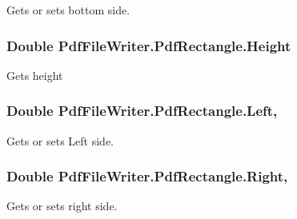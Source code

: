 Gets or sets bottom side. 

\subsubsection[{\texorpdfstring{Height}{Height}}]{\setlength{\rightskip}{0pt plus 5cm}Double Pdf\+File\+Writer.\+Pdf\+Rectangle.\+Height\hspace{0.3cm}{\ttfamily [get]}}\hypertarget{class_pdf_file_writer_1_1_pdf_rectangle_a22ce779c7843f7e36611253c92629ffb}{}\label{class_pdf_file_writer_1_1_pdf_rectangle_a22ce779c7843f7e36611253c92629ffb}


Gets height 

\subsubsection[{\texorpdfstring{Left}{Left}}]{\setlength{\rightskip}{0pt plus 5cm}Double Pdf\+File\+Writer.\+Pdf\+Rectangle.\+Left\hspace{0.3cm}{\ttfamily [get]}, {\ttfamily [set]}}\hypertarget{class_pdf_file_writer_1_1_pdf_rectangle_ab9bdc68f02bdfab49439b04e597bdf97}{}\label{class_pdf_file_writer_1_1_pdf_rectangle_ab9bdc68f02bdfab49439b04e597bdf97}


Gets or sets Left side. 

\subsubsection[{\texorpdfstring{Right}{Right}}]{\setlength{\rightskip}{0pt plus 5cm}Double Pdf\+File\+Writer.\+Pdf\+Rectangle.\+Right\hspace{0.3cm}{\ttfamily [get]}, {\ttfamily [set]}}\hypertarget{class_pdf_file_writer_1_1_pdf_rectangle_ae0d410f44d87053e0125255b4e139fcb}{}\label{class_pdf_file_writer_1_1_pdf_rectangle_ae0d410f44d87053e0125255b4e139fcb}


Gets or sets right side. 

